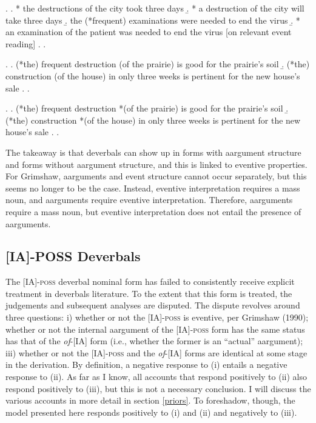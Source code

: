 \documentclass[12pt]{article}
\begin{document}
\singlespacing

\ex. \label{count} \a. * the destructions of the city took three days
\b. * a destruction of the city will take three days
\b. the (*frequent) examinations were needed to end the virus
\b. * an examination of the patient was needed to end the virus \hfill [on relevant event reading]
\z. \z.

\ex.\label{noarg} \a. (*the) frequent destruction (of the prairie) is good for the prairie's soil
\b. (*the) construction (of the house) in only three weeks is pertinent for the new house's sale
\z. \z. \par

\ex.\label{noarg1} \a. (*the) frequent destruction *(of the prairie) is good for the prairie's soil
\b. (*the) construction *(of the house) in only three weeks is pertinent for the new house's sale
\z. \z. \par

\doublespacing

The takeaway is that deverbals can show up in forms with aargument structure and forms without aargument structure, and this is linked to eventive properties. For Grimshaw, aarguments and event structure cannot occur separately, but this seems no longer to be the case. Instead, eventive interpretation requires a mass noun, and aarguments require eventive interpretation. Therefore, aarguments require a mass noun, but eventive interpretation does not entail the presence of aarguments.

\subsection{[IA]-POSS Deverbals}\label{facts3}

The [IA]-\textsc{poss} deverbal nominal form has failed to consistently receive explicit treatment in deverbals literature. To the extent that this form is treated, the judgements and subsequent analyses are disputed. The dispute revolves around three questions: i) whether or not the [IA]-\textsc{poss} is eventive, per Grimshaw (1990); whether or not the internal aargument of the [IA]-\textsc{poss} form has the same status has that of the \textit{of}-[IA] form (i.e., whether the former is an ``actual'' aargument); iii) whether or not the [IA]-\textsc{poss} and the \textit{of}-[IA] forms are identical at some stage in the derivation. By definition, a negative response to (i) entails a negative response to (ii). As far as I know, all accounts that respond positively to (ii) also respond positively to (iii), but this is not a necessary conclusion. I will discuss the various accounts in more detail in section \ref{priors}. To foreshadow, though, the model presented here responds positively to (i) and (ii) and negatively to (iii).
\end{document}
